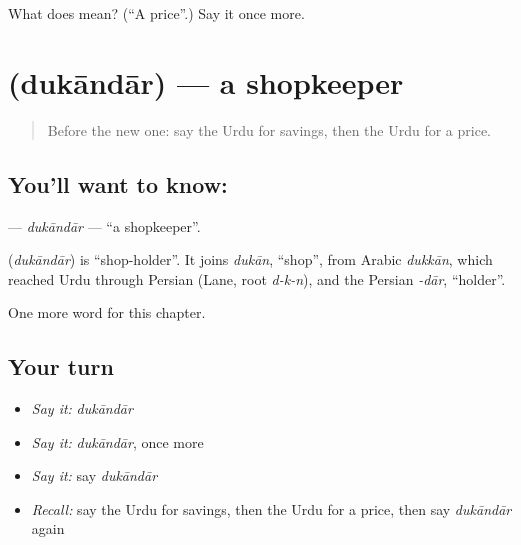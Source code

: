 \begin{tcolorbox}[breakable,colback=teal!4,colframe=teal!35!black,title={Before you move on}]
What does  mean? (\textquotedblleft{}A price\textquotedblright{}.) Say it once more.
\end{tcolorbox}
\section[\texorpdfstring{\ur{دکاندار} (dukāndār)}{دکاندار (dukāndār)}]{ (dukāndār) — a shopkeeper}

\label{lesson:UR-C236-dukandar}



\begin{quote}
Before the new one: say the Urdu for savings, then the Urdu for a price.
\end{quote}

\subsection*{You'll want to know: }
\textbf{} — \emph{dukāndār} — \textquotedblleft{}a shopkeeper\textquotedblright{}.

\begin{cousinweb}
\textbf{} (\emph{dukāndār}) is \textquotedblleft{}shop-holder\textquotedblright{}. It joins \emph{dukān}, \textquotedblleft{}shop\textquotedblright{}, from Arabic \emph{dukkān}, which reached Urdu through Persian (Lane, root \emph{d-k-n}), and the Persian \emph{-dār}, \textquotedblleft{}holder\textquotedblright{}.
\end{cousinweb}

\begin{grammarlens}[title={What you've built}]
One more word for this chapter.
\end{grammarlens}

\subsection*{Your turn}
\begin{itemize}
\raggedright
  \item \emph{Say it:} \emph{dukāndār}
  \item \emph{Say it:} \emph{dukāndār}, once more
  \item \emph{Say it:} say \emph{dukāndār}
  \item \emph{Recall:} say the Urdu for savings, then the Urdu for a price, then say \emph{dukāndār} again
\end{itemize}

